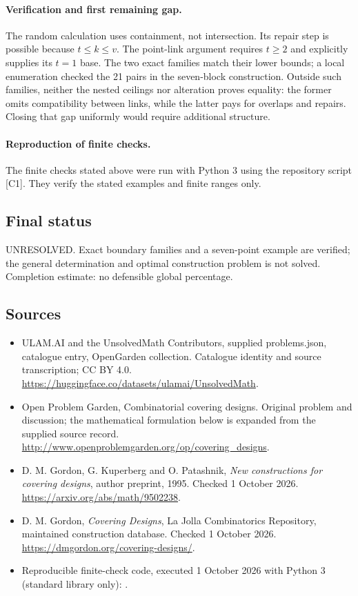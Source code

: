 \documentclass[11pt,a4paper]{article}
\begin{document}
\paragraph{Verification and first remaining gap.}
The random calculation uses containment, not intersection. Its repair
step is possible because $t\le k\le v$. The point-link argument
requires $t\ge2$ and explicitly supplies its $t=1$ base. The two exact
families match their lower bounds; a local enumeration checked the 21
pairs in the seven-block construction. Outside such families, neither
the nested ceilings nor alteration proves equality: the former omits
compatibility between links, while the latter pays for overlaps and
repairs. Closing that gap uniformly would require additional structure.

\paragraph{Reproduction of finite checks.}
The finite checks stated above were run with Python 3 using the repository
script [C1]. They verify the stated examples and finite ranges only.

\subsection{Final status}
UNRESOLVED. Exact boundary families and a seven-point example are
verified; the general determination and optimal construction problem is
not solved. Completion estimate: no defensible global percentage.

\subsection{Sources}
\begin{itemize}
\item[S1] ULAM.AI and the UnsolvedMath Contributors, supplied problems.json, catalogue entry, OpenGarden collection. Catalogue identity and source transcription; CC BY 4.0.
\url{https://huggingface.co/datasets/ulamai/UnsolvedMath}.
\item[S2] Open Problem Garden, Combinatorial covering designs. Original problem and discussion; the mathematical formulation below is expanded from the supplied source record.
\url{http://www.openproblemgarden.org/op/covering_designs}.
\item[S3] D. M. Gordon, G. Kuperberg and O. Patashnik, \emph{New constructions for covering designs}, author preprint, 1995. Checked 1 October 2026.
\url{https://arxiv.org/abs/math/9502238}.
\item[S4] D. M. Gordon, \emph{Covering Designs}, La Jolla Combinatorics Repository, maintained construction database. Checked 1 October 2026.
\url{https://dmgordon.org/covering-designs/}.
\item[C1] Reproducible finite-check code, executed 1 October 2026 with Python 3 (standard library only):
.
\end{itemize}
\end{document}
